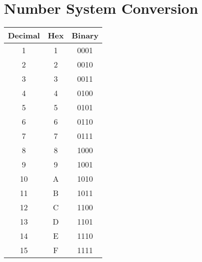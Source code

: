 \section{Number System Conversion
}

\begin{tabular}{ |c|c|c| } 
 \hline
 \textbf{Decimal} & \textbf{Hex} & \textbf{Binary} \\ 
 \hline
 1 & 1 & 0001 \\
 2 & 2 & 0010 \\
 3 & 3 & 0011 \\
 4 & 4 & 0100 \\
 5 & 5 & 0101 \\
 6 & 6 & 0110 \\
 7 & 7 & 0111 \\
 8 & 8 & 1000 \\
 9 & 9 & 1001 \\
 10 & A & 1010 \\
 11 & B & 1011 \\
 12 & C & 1100 \\
 13 & D & 1101 \\
 14 & E & 1110 \\
 15 & F & 1111 \\
 \hline
\end{tabular}